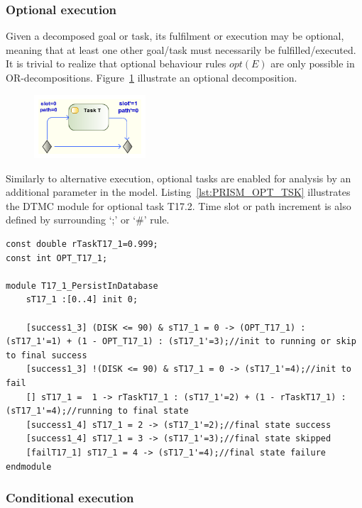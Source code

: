 \subsubsection{Optional execution}

Given a decomposed goal or task, its fulfilment or execution may be optional, meaning that at least one other goal/task must necessarily be fulfilled/executed. It is trivial to realize that optional behaviour rules $opt(E)$ are only possible in OR-decompositions. Figure~\ref{fig:UML_OPT_TSK} illustrate an optional decomposition.

\begin{figure}[ht!]
\centering
\includegraphics[width=0.37\textwidth]{imgs/UML_OPT_TSK.png}
\caption{}
\label{fig:UML_OPT_TSK}
\end{figure}

Similarly to alternative execution, optional tasks are enabled for analysis by an additional parameter in the model. Listing~\ref{lst:PRISM_OPT_TSK} illustrates the DTMC module for optional task T17.2. Time slot or path increment is also defined by surrounding `;' or `\#' rule. 
\medskip

\begin{lstlisting}[language=Prism, caption={An optional task T17.1 as a DTMC module with additional boolean parameter.},label={lst:PRISM_OPT_TSK}] 
const double rTaskT17_1=0.999;
const int OPT_T17_1;

module T17_1_PersistInDatabase
	sT17_1 :[0..4] init 0;
	
	[success1_3] (DISK <= 90) & sT17_1 = 0 -> (OPT_T17_1) : (sT17_1'=1) + (1 - OPT_T17_1) : (sT17_1'=3);//init to running or skip to final success
	[success1_3] !(DISK <= 90) & sT17_1 = 0 -> (sT17_1'=4);//init to fail
	[] sT17_1 =  1 -> rTaskT17_1 : (sT17_1'=2) + (1 - rTaskT17_1) : (sT17_1'=4);//running to final state
	[success1_4] sT17_1 = 2 -> (sT17_1'=2);//final state success
	[success1_4] sT17_1 = 3 -> (sT17_1'=3);//final state skipped
	[failT17_1] sT17_1 = 4 -> (sT17_1'=4);//final state failure
endmodule
\end{lstlisting}

\subsubsection{Conditional execution}

